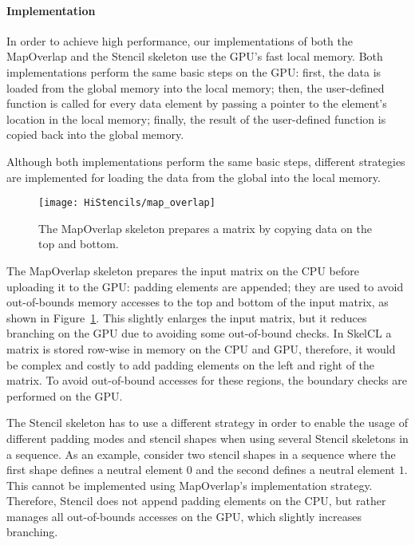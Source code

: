 \paragraph{Implementation}
In order to achieve high performance, our implementations of both the MapOverlap and the Stencil skeleton use the GPU's fast local memory.
Both implementations perform the same basic steps on the GPU:
first, the data is loaded from the global memory into the local memory;
then, the user-defined function is called for every data element by passing a pointer to the element's location in the local memory;
finally, the result of the user-defined function is copied back into the global memory.

Although both implementations perform the same basic steps, different strategies are implemented for loading the data from the global into the local memory.

\begin{figure}
  \begin{centering}
    \texttt{[image: HiStencils/map\_overlap]}
    \caption{The MapOverlap skeleton prepares a matrix by copying data on the top and bottom.}
    \label{fig:preparation}
    \vspace{-.5em}
  \end{centering}
\end{figure}

The MapOverlap skeleton prepares the input matrix on the CPU before uploading it to the GPU:
padding elements are appended; they are used to avoid out-of-bounds memory accesses to the top and bottom of the input matrix, as shown in Figure~\ref{fig:preparation}.
This slightly enlarges the input matrix, but it reduces branching on the GPU due to avoiding some out-of-bound checks.
In SkelCL a matrix is stored row-wise in memory on the CPU and GPU, therefore, it would be complex and costly to add padding elements on the left and right of the matrix.
To avoid out-of-bound accesses for these regions, the boundary checks are performed on the GPU.

The Stencil skeleton has to use a different strategy in order to enable the usage of different padding modes and stencil shapes when using several Stencil skeletons in a sequence.
As an example, consider two stencil shapes in a sequence where the first shape defines a neutral element $0$ and the second defines a neutral element $1$.
This cannot be implemented using MapOverlap's implementation strategy.
Therefore, Stencil does not append padding elements on the CPU, but rather manages all out-of-bounds accesses on the GPU, which slightly increases branching.

